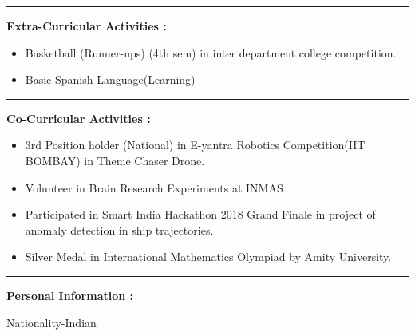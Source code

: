 \documentclass[11pt,a4paper]{article}
\begin{document}
\hrule
\begin{multicols}{2}
	\begin{minipage}{0.15\paperwidth}
		\textbf{Extra-Curricular\linebreak
		Activities :}
	\end{minipage}
	\begin{minipage}{0.7\paperwidth}
		\begin{itemize}
			\item Basketball (Runner-ups) (4th sem) in inter department college competition.
			\item Basic Spanish Language(Learning)
		\end{itemize}
	\end{minipage}
\end{multicols}
\hfill
\hrule
\begin{multicols}{2}
	\begin{minipage}{0.15\paperwidth}
		\textbf{Co-Curricular\linebreak
			Activities :}
	\end{minipage}
	\begin{minipage}{0.7\paperwidth}
		\begin{itemize}
			\item 3rd Position holder (National) in E-yantra Robotics Competition(IIT BOMBAY) in Theme Chaser Drone.
			\item Volunteer in Brain Research Experiments at INMAS
			\item Participated in Smart India Hackathon 2018 Grand Finale in project of anomaly detection in ship trajectories.
			\item Silver Medal in International Mathematics Olympiad by Amity University.
		\end{itemize}
	\end{minipage}
\end{multicols}
\hfill
\hrule
\begin{multicols}{2}
	\begin{minipage}{0.17\paperwidth}
		\textbf{Personal\linebreak
		Information :}
	\end{minipage}
	\begin{minipage}{0.7\paperwidth}
		Nationality-Indian\linebreak
	\end{minipage}
\end{multicols}
\hfill
\end{document}
